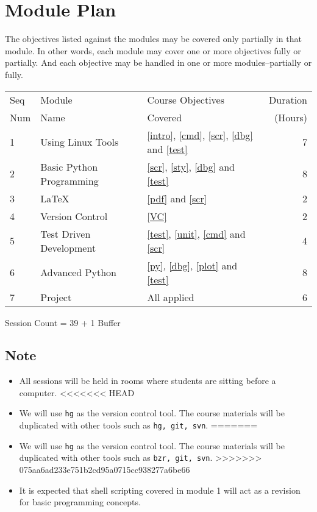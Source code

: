 \documentclass{article}
\begin{document}
\section{Module Plan}
The objectives listed against the modules may be covered only partially in that module. In other words, each module may cover one or more objectives fully or partially. And each objective may be handled in one or more modules--partially or fully. 

\begin{tabular}{||l|l|l|r||}\hline\hline
Seq & Module  & Course Objectives & Duration\\
Num & Name    & Covered           & (Hours)\\\hline 
1 & Using Linux Tools        & \ref{intro}, \ref{cmd}, \ref{scr}, \ref{dbg} and  \ref{test} & 7\\\hline
2 & Basic Python Programming & \ref{scr}, \ref{sty}, \ref{dbg} and \ref{test}               & 8\\\hline 
3 & LaTeX                    & \ref{pdf} and \ref{scr}                                      & 2\\\hline
4 & Version Control          & \ref{VC}                                                     & 2\\\hline
5 & Test Driven Development  & \ref{test}, \ref{unit}, \ref{cmd} and \ref{scr}              & 4\\\hline
6 & Advanced Python          & \ref{py}, \ref{dbg}, \ref{plot} and \ref{test}               & 8\\\hline
7 & Project                  & All applied                                                  & 6\\\hline
\end{tabular}    

Session Count = 39 + 1 Buffer
\subsection*{Note}
\begin{itemize}
    \item All sessions will be held in rooms where students are sitting before a computer.
<<<<<<< HEAD
    \item We will use \texttt{hg} as the version control tool. The course materials will be duplicated with other tools
          such as \texttt{hg, git, svn}.
=======
    \item We will use \texttt{hg} as the version control tool. The course materials will be duplicated with other tools
          such as \texttt{bzr, git, svn}.
>>>>>>> 075aa6ad233e751b2cd95a0715cc938277a6be66
    \item It is expected that shell scripting covered in module 1 will act as a revision for basic programming
      concepts.
\end{itemize}     
\end{document}
